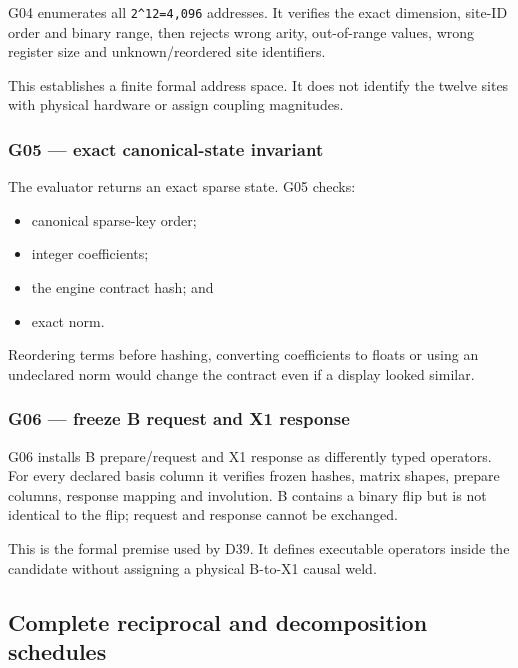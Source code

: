 G04 enumerates all \texttt{2\^{}12=4,096} addresses. It verifies the
exact dimension, site-ID order and binary range, then rejects wrong
arity, out-of-range values, wrong register size and unknown/reordered
site identifiers.

This establishes a finite formal address space. It does not identify the
twelve sites with physical hardware or assign coupling magnitudes.

\subsubsection{G05 --- exact canonical-state
invariant}\label{viii-ch02-g05-exact-canonical-state-invariant}

The evaluator returns an exact sparse state. G05 checks:

\begin{itemize}
\tightlist
\item
  canonical sparse-key order;
\item
  integer coefficients;
\item
  the engine contract hash; and
\item
  exact norm.
\end{itemize}

Reordering terms before hashing, converting coefficients to floats or
using an undeclared norm would change the contract even if a display
looked similar.

\subsubsection{G06 --- freeze B request and X1
response}\label{viii-ch02-g06-freeze-b-request-and-x1-response}

G06 installs B prepare/request and X1 response as differently typed
operators. For every declared basis column it verifies frozen hashes,
matrix shapes, prepare columns, response mapping and involution. B
contains a binary flip but is not identical to the flip; request and
response cannot be exchanged.

This is the formal premise used by D39. It defines executable operators
inside the candidate without assigning a physical B-to-X1 causal weld.

\subsection{Complete reciprocal and decomposition
schedules}\label{viii-ch02-complete-reciprocal-and-decomposition-schedules}

